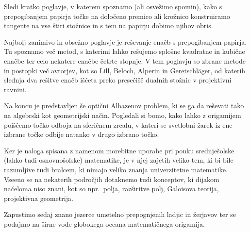Sledi kratko poglavje, v katerem spoznamo (ali osvežimo spomin), kako s prepogibanjem papirja točke na določeno premico ali krožnico konstruiramo tangente na vse štiri stožnice in s tem na papirju dobimo njihov obris.

Najbolj zanimivo in obsežno poglavje je reševanje enačb s prepogibanjem papirja. Tu spoznamo več metod, s katerimi lahko rešujemo splošne kvadratne in kubične enačbe ter celo nekatere enačbe četrte stopnje. V tem poglavju so zbrane metode in postopki več avtorjev, kot so Lill, Beloch, Alperin in Geretschläger, od katerih slednja dva rešitve enačb iščeta preko presečišč dualnih stožnic v projektivni ravnini.

Na koncu je predstavljen še optični Alhazenov problem, ki se ga da reševati tako na algebrski kot geometrijski način. Pogledali si bomo, kako lahko z origamijem poiščemo točko odboja na sferičnem zrcalu, v kateri se svetlobni žarek iz ene izbrane točke odbije natanko v drugo izbrano točko.

Ker je naloga spisana z namenom morebitne uporabe pri pouku srednješolske (lahko tudi osnovnošolske) matematike, je v njej zajetih veliko tem, ki bi bile razumljive tudi bralcem, ki nimajo veliko znanja univerzitetne matematike. Vseeno se na nekaterih področjih dotaknemo tudi konceptov, ki dijakom načeloma niso znani, kot so npr.\ polja, razširitve polj, Galoisova teorija, projektivna geometrija.

Zapustimo sedaj znano jezerce umetelno prepognjenih ladjic in žerjavov ter se podajmo na širne vode globokega oceana matematičnega origamija.
